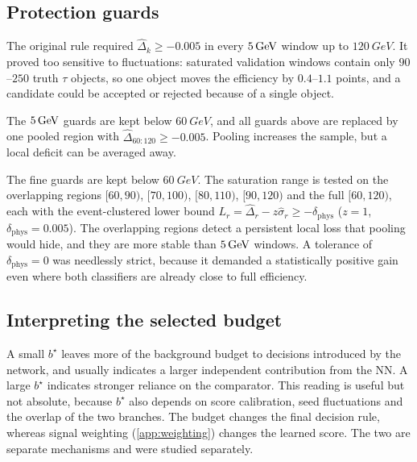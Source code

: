 \subsection{Protection guards}
\begin{description}[leftmargin=0pt,itemsep=2pt]
  \item[Per window.] The original rule required $\hat\Delta_k\geq-0.005$ in every $5\,\mathrm{GeV}$ window up to $\SI{120}{GeV}$. It proved too sensitive to fluctuations: saturated validation windows contain only $90$--$250$ truth $\tau$ objects, so one object moves the efficiency by $0.4$--$1.1$ points, and a candidate could be accepted or rejected because of a single object.
  \item[Pooled saturation.] The $5\,\mathrm{GeV}$ guards are kept below $\SI{60}{GeV}$, and all guards above are replaced by one pooled region with $\hat\Delta_{60:120}\geq-0.005$. Pooling increases the sample, but a local deficit can be averaged away.
  \item[Multiscale saturation.] The fine guards are kept below $\SI{60}{GeV}$. The saturation range is tested on the overlapping regions $[60,90)$, $[70,100)$, $[80,110)$, $[90,120)$ and the full $[60,120)$, each with the event-clustered lower bound $L_r=\hat\Delta_r-z\hat\sigma_r\geq-\delta_{\mathrm{phys}}$ ($z=1$, $\delta_{\mathrm{phys}}=0.005$). The overlapping regions detect a persistent local loss that pooling would hide, and they are more stable than $5\,\mathrm{GeV}$ windows. A tolerance of $\delta_{\mathrm{phys}}=0$ was needlessly strict, because it demanded a statistically positive gain even where both classifiers are already close to full efficiency.
\end{description}

\subsection{Interpreting the selected budget}
A small $b^\star$ leaves more of the background budget to decisions introduced by the network, and usually indicates a larger independent contribution from the NN. A large $b^\star$ indicates stronger reliance on the comparator. This reading is useful but not absolute, because $b^\star$ also depends on score calibration, seed fluctuations and the overlap of the two branches. The budget changes the final decision rule, whereas signal weighting (\cref{app:weighting}) changes the learned score. The two are separate mechanisms and were studied separately.
